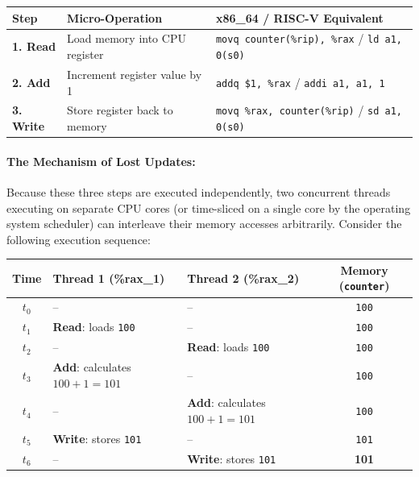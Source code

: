 \documentclass{labreport}
\begin{document}
\begin{center}
\begin{tabularx}{\textwidth}{l p{4.5cm} X}
\toprule
\textbf{Step} & \textbf{Micro-Operation} & \textbf{x86\_64 / RISC-V Equivalent} \\
\midrule
\textbf{1. Read} & Load memory into CPU register & \texttt{movq counter(\%rip), \%rax} \quad / \quad \texttt{ld a1, 0(s0)} \\
\textbf{2. Add}  & Increment register value by 1 & \texttt{addq \$1, \%rax} \quad / \quad \texttt{addi a1, a1, 1} \\
\textbf{3. Write}& Store register back to memory & \texttt{movq \%rax, counter(\%rip)} \quad / \quad \texttt{sd a1, 0(s0)} \\
\bottomrule
\end{tabularx}
\end{center}

\paragraph{The Mechanism of Lost Updates:}
Because these three steps are executed independently, two concurrent threads executing on separate CPU cores (or time-sliced on a single core by the operating system scheduler) can interleave their memory accesses arbitrarily. Consider the following execution sequence:

\begin{center}
\begin{tabularx}{0.95\textwidth}{c l l c}
\toprule
\textbf{Time} & \textbf{Thread 1 (\%rax\_1)} & \textbf{Thread 2 (\%rax\_2)} & \textbf{Memory (\texttt{counter})} \\
\midrule
$t_0$ & -- & -- & \texttt{100} \\
$t_1$ & \textbf{Read}: loads \texttt{100} & -- & \texttt{100} \\
$t_2$ & -- & \textbf{Read}: loads \texttt{100} & \texttt{100} \\
$t_3$ & \textbf{Add}: calculates $100+1=101$ & -- & \texttt{100} \\
$t_4$ & -- & \textbf{Add}: calculates $100+1=101$ & \texttt{100} \\
$t_5$ & \textbf{Write}: stores \texttt{101} & -- & \texttt{101} \\
$t_6$ & -- & \textbf{Write}: stores \texttt{101} & \textbf{101} \\
\bottomrule
\end{tabularx}
\end{center}
\end{document}
